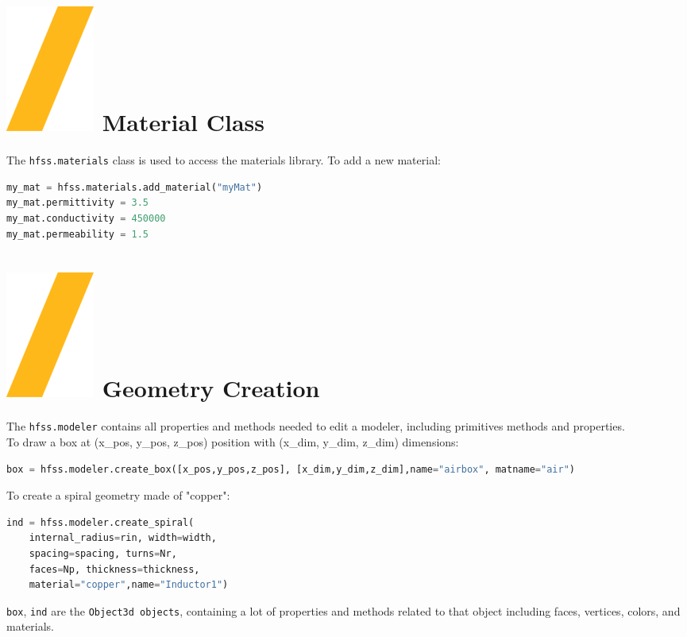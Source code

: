 \documentclass[9pt,landscape]{article}
\begin{document}
\begin{multicols}{3}
\section{\includegraphics[height=\fontcharht\font`\S]{slash.png} Material Class}
The \texttt{hfss.materials} class is used to access the materials library.
\newline
To add a new material: 
\begin{lstlisting}[language=Python]
my_mat = hfss.materials.add_material("myMat")
my_mat.permittivity = 3.5
my_mat.conductivity = 450000
my_mat.permeability = 1.5
\end{lstlisting}

\section{\includegraphics[height=\fontcharht\font`\S]{slash.png} Geometry Creation}
The \texttt{hfss.modeler} contains all properties and methods needed to edit a modeler, including primitives methods and properties.
\newline
\\
To draw a box at (x\_pos, y\_pos, z\_pos) position with (x\_dim, y\_dim, z\_dim) dimensions:
\begin{lstlisting}[language=Python]
box = hfss.modeler.create_box([x_pos,y_pos,z_pos], [x_dim,y_dim,z_dim],name="airbox", matname="air")
\end{lstlisting}
To create a spiral geometry made of "copper":
\begin{lstlisting}[language=Python]
ind = hfss.modeler.create_spiral(
	internal_radius=rin, width=width,
	spacing=spacing, turns=Nr,
	faces=Np, thickness=thickness,
	material="copper",name="Inductor1")
\end{lstlisting}
\columnbreak
\texttt{box}, \texttt{ind} are the \texttt{Object3d objects}, containing a lot of properties and methods related to that object including faces, vertices, colors, and materials.


\end{multicols}
\end{document}

